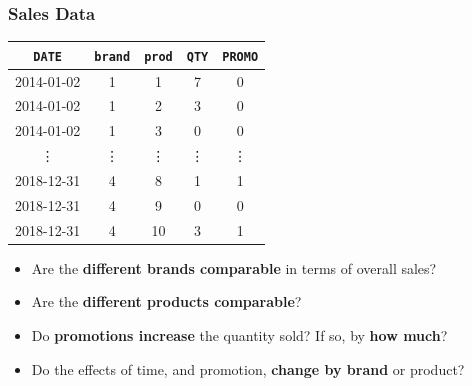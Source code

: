 \subsubsection{Sales Data}
\begin{table}[H]
    \centering
    \begin{tabular}{ccccc}
        \toprule
        \texttt{DATE} & \texttt{brand} & \texttt{prod} & \texttt{QTY} & \texttt{PROMO} \\
        \midrule
        2014-01-02    & 1              & 1             & 7            & 0              \\%
        2014-01-02    & 1              & 2             & 3            & 0              \\%
        2014-01-02    & 1              & 3             & 0            & 0              \\%
        \vdots        & \vdots         & \vdots        & \vdots       & \vdots         \\%
        2018-12-31    & 4              & 8             & 1            & 1              \\%
        2018-12-31    & 4              & 9             & 0            & 0              \\%
        2018-12-31    & 4              & 10            & 3            & 1              \\%
        \bottomrule
    \end{tabular}
\end{table}
\begin{itemize}
    \item Are the \textbf{different brands comparable} in terms of overall sales?
    \item Are the \textbf{different products comparable}?
    \item Do \textbf{promotions increase} the quantity sold? If so, by \textbf{ how much}?
    \item Do the effects of time, and promotion, \textbf{change by brand} or product?
\end{itemize}
